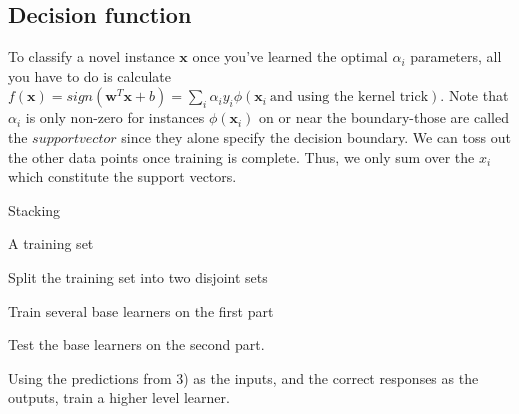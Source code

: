 \documentclass[a4paper]{article}
\begin{document}
\begin{algorithm}
\begin{algorithmic}
      
      \section{Decision function}
To classify a novel instance $\textbf{x}$ once you've learned the optimal $\alpha_{i}$ parameters, all you have to do is calculate $f(\textbf{x}) = sign(\textbf{w}^T\textbf{x}+b) = \sum_{i}\alpha_{i}y_{i}\phi(\textbf{x}_{i}\  \text{and using the kernel trick})$. Note that $\alpha_{i}$ is only non-zero for instances $\phi(\textbf{x}_{i})$ on or near the boundary-those are called the $support vector $ since they alone specify the decision boundary. We can toss out the other data points once training is complete. Thus, we only sum over the $x_{i}$ which constitute the support vectors.
  \end{algorithmic}
\end{algorithm} 


 \begin{algorithm}
   \caption{Stacking ~\cite{Wolpert92stackedgeneralization
   } }
   
   
   
  \begin{algorithmic}[1]
   \INPUT 
   \Statex A training set 
   
  
  \State Split the training set into two disjoint sets
  
  \State Train several base learners on the first part
  
  \State Test the base learners on the second part.
  
  \State Using the predictions from 3) as the inputs, and the correct responses as the outputs, train a higher level learner.
    
   
    \end{algorithmic}
\end{algorithm} 
      
\end{document}

